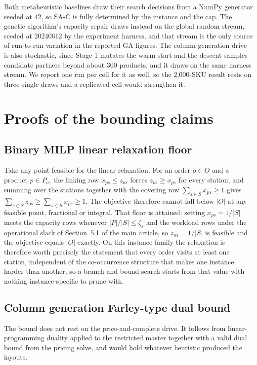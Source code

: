 \documentclass[11pt]{article}
\begin{document}
Both metaheuristic baselines draw their search decisions from a NumPy generator seeded at 42, so
SA-C is fully determined by the instance and the cap. The genetic algorithm's capacity repair draws
instead on the global random stream, seeded at 20240612 by the experiment harness, and that stream
is the only source of run-to-run variation in the reported GA figures. The column-generation drive
is also stochastic, since Stage 1 mutates the warm start and the descent samples candidate partners
beyond about 300 products, and it draws on the same harness stream. We report one run per cell for
it as well, so the 2,000-SKU result rests on three single draws and a replicated cell would
strengthen it.

\section{Proofs of the bounding claims}\label{sup:proofs}

\subsection{Binary MILP linear relaxation floor}\label{sup:bounds_milp}
Take any point feasible for the linear relaxation. For an order $o \in O$ and a product
$p \in P_o$, the linking row $x_{ps}\le z_{os}$ forces $z_{os}\ge x_{ps}$ for every station, and
summing over the stations together with the covering row $\sum_{s\in S} x_{ps}\ge 1$ gives
$\sum_{s\in S} z_{os}\ge\sum_{s\in S} x_{ps}\ge 1$. The objective
therefore cannot fall below $|O|$ at any feasible point, fractional or integral. That floor is
attained: setting $x_{ps}=1/|S|$ meets the capacity rows whenever $|P|/|S|\le\zeta_s$ and the
workload rows under the operational slack of Section~5.1 of the main article, so $z_{os}=1/|S|$ is
feasible and the objective equals $|O|$ exactly. On this instance family the relaxation is
therefore worth precisely the statement that every order visits at least one station, independent
of the co-occurrence structure that makes one instance harder than another, so a branch-and-bound
search starts from that value with nothing instance-specific to prune with.

\subsection{Column generation Farley-type dual bound}\label{sup:bounds_cg}
The bound does not rest on the price-and-complete drive. It follows from linear-programming duality
applied to the restricted master together with a valid dual bound from the pricing solve, and would
hold whatever heuristic produced the layouts.
\end{document}
